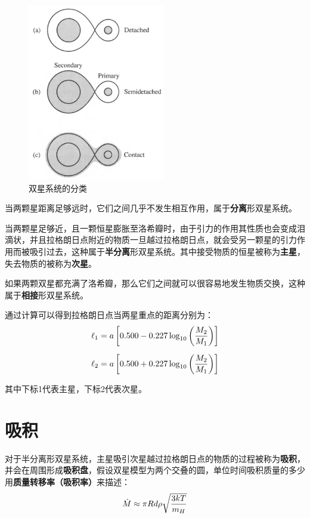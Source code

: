 \documentclass[openany]{ctexbook}
\begin{document}
\begin{figure}[hbt]
  \centering
  \includegraphics[width=6cm]{chapters/18/binary}
  \caption{双星系统的分类}
  \label{fig:binary}
\end{figure}

当两颗星距离足够远时，它们之间几乎不发生相互作用，属于\textbf{分离}形双星系统。

当两颗星足够近，且一颗恒星膨胀至洛希瓣时，由于引力的作用其性质也会变成泪滴状，并且拉格朗日点附近的物质一旦越过拉格朗日点，就会受另一颗星的引力作用而被吸引过去，这种属于\textbf{半分离}形双星系统。其中接受物质的恒星被称为\textbf{主星}，失去物质的被称为\textbf{次星}。

如果两颗双星都充满了洛希瓣，那么它们之间就可以很容易地发生物质交换，这种属于\textbf{相接}形双星系统。

通过计算可以得到拉格朗日点当两星重点的距离分别为：
\begin{align}
  \ell_1 &=a\left[0.500-0.227\log_{10}\left({M_2\over M_1}\right)\right]\\[2mm]
  \ell_2 &=a\left[0.500+0.227\log_{10}\left({M_2\over M_1}\right)\right]
\end{align}

其中下标1代表主星，下标2代表次星。

\section{吸积}
对于半分离形双星系统，主星吸引次星越过拉格朗日点的物质的过程被称为\textbf{吸积}，并会在周围形成\textbf{吸积盘}，假设双星模型为两个交叠的圆，单位时间吸积质量的多少用\textbf{质量转移率（吸积率）}来描述：
\begin{equation}
  \dot M\approx \pi Rd\rho \sqrt{3kT\over m_H}
\end{equation}
\end{document}
